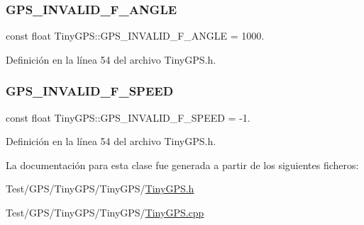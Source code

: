 \subsubsection{\texorpdfstring{G\+P\+S\+\_\+\+I\+N\+V\+A\+L\+I\+D\+\_\+\+F\+\_\+\+A\+N\+G\+LE}{GPS\_INVALID\_F\_ANGLE}}
{\footnotesize\ttfamily const float Tiny\+G\+P\+S\+::\+G\+P\+S\+\_\+\+I\+N\+V\+A\+L\+I\+D\+\_\+\+F\+\_\+\+A\+N\+G\+LE = 1000.\hspace{0.3cm}{\ttfamily [static]}}



Definición en la línea 54 del archivo Tiny\+G\+P\+S.\+h.

\mbox{\label{class_tiny_g_p_s_a6cc8eac7258e9263665fabaa03380f97}} 
\subsubsection{\texorpdfstring{G\+P\+S\+\_\+\+I\+N\+V\+A\+L\+I\+D\+\_\+\+F\+\_\+\+S\+P\+E\+ED}{GPS\_INVALID\_F\_SPEED}}
{\footnotesize\ttfamily const float Tiny\+G\+P\+S\+::\+G\+P\+S\+\_\+\+I\+N\+V\+A\+L\+I\+D\+\_\+\+F\+\_\+\+S\+P\+E\+ED = -\/1.\hspace{0.3cm}{\ttfamily [static]}}



Definición en la línea 54 del archivo Tiny\+G\+P\+S.\+h.



La documentación para esta clase fue generada a partir de los siguientes ficheros\+:\begin{DoxyCompactItemize}
\item 
Test/\+G\+P\+S/\+Tiny\+G\+P\+S/\+Tiny\+G\+P\+S/\hyperlink{_tiny_g_p_s_8h}{Tiny\+G\+P\+S.\+h}\item 
Test/\+G\+P\+S/\+Tiny\+G\+P\+S/\+Tiny\+G\+P\+S/\hyperlink{_tiny_g_p_s_8cpp}{Tiny\+G\+P\+S.\+cpp}\end{DoxyCompactItemize}
